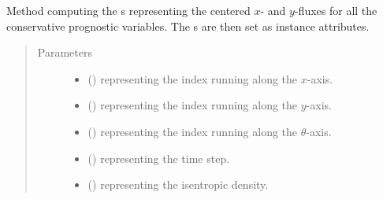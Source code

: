 \documentclass[letterpaper,10pt,english]{sphinxmanual}
\begin{document}
\begin{fulllineitems}
\begin{fulllineitems}
\begin{quote}
\begin{description}
\begin{itemize}
\end{itemize}

\end{description}\end{quote}

\end{fulllineitems}


\begin{fulllineitems}
\label{\detokenize{api:tasmania.dycore.flux_isentropic_centered.FluxIsentropicCentered._compute_horizontal_fluxes}}
Method computing the s representing the centered \(x\)-
and \(y\)-fluxes for all the conservative prognostic variables.
The s are then set as instance attributes.
\begin{quote}\begin{description}
\item[{Parameters}] \leavevmode\begin{itemize}
\item {} 
 () \textendash{}  representing the index running along the \(x\)-axis.

\item {} 
 () \textendash{}  representing the index running along the \(y\)-axis.

\item {} 
 () \textendash{}  representing the index running along the \(\theta\)-axis.

\item {} 
 () \textendash{}  representing the time step.

\item {} 
 () \textendash{}  representing the isentropic density.


\end{itemize}
\end{description}
\end{quote}
\end{fulllineitems}
\end{fulllineitems}
\end{document}
